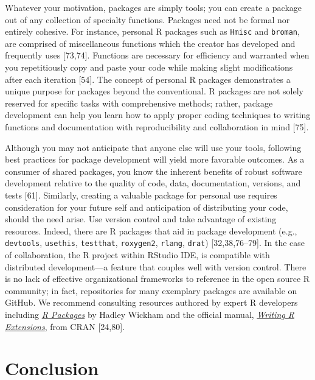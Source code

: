 \documentclass[10pt,letterpaper]{article}
\begin{document}
Whatever your motivation, packages are simply tools; you can create a
package out of any collection of specialty functions. Packages need not
be formal nor entirely cohesive. For instance, personal R packages such
as \texttt{Hmisc} and \texttt{broman}, are comprised of miscellaneous
functions which the creator has developed and frequently uses
{[}73,74{]}. Functions are necessary for efficiency and warranted when
you repetitiously copy and paste your code while making slight
modifications after each iteration {[}54{]}. The concept of personal R
packages demonstrates a unique purpose for packages beyond the
conventional. R packages are not solely reserved for specific tasks with
comprehensive methods; rather, package development can help you learn
how to apply proper coding techniques to writing functions and
documentation with reproducibility and collaboration in mind {[}75{]}.

Although you may not anticipate that anyone else will use your tools,
following best practices for package development will yield more
favorable outcomes. As a consumer of shared packages, you know the
inherent benefits of robust software development relative to the quality
of code, data, documentation, versions, and tests {[}61{]}. Similarly,
creating a valuable package for personal use requires consideration for
your future self and anticipation of distributing your code, should the
need arise. Use version control and take advantage of existing
resources. Indeed, there are R packages that aid in package development
(e.g., \texttt{devtools}, \texttt{usethis}, \texttt{testthat},
\texttt{roxygen2}, \texttt{rlang}, \texttt{drat}) {[}32,38,76--79{]}. In
the case of collaboration, the R project within RStudio IDE, is
compatible with distributed development---a feature that couples well
with version control. There is no lack of effective organizational
frameworks to reference in the open source R community; in fact,
repositories for many exemplary packages are available on GitHub. We
recommend consulting resources authored by expert R developers including
\href{https://r-pkgs.org/}{\emph{R Packages}} by Hadley Wickham and the
official manual,
\href{https://cran.r-project.org/doc/manuals/r-release/R-exts.html}{\emph{Writing
R Extensions}}, from CRAN {[}24,80{]}.

\hypertarget{conclusion}{%
\section{Conclusion}\label{conclusion}}
\end{document}
